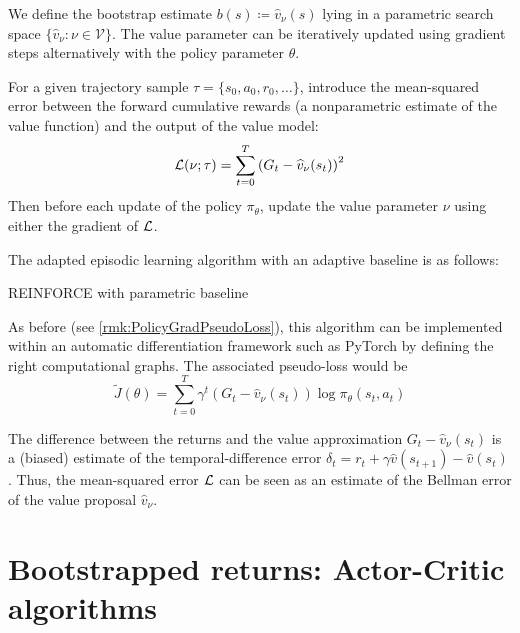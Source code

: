 \documentclass[../course-notes.tex]{subfiles}
\begin{document}
We define the bootstrap estimate $b(s) \coloneqq \widehat{v}_\nu(s)$ lying in a parametric search space $\{\widehat{v}_\nu : \nu \in \mathcal{V}\}$. The value parameter can be iteratively updated using gradient steps alternatively with the policy parameter $\theta$.

For a given trajectory sample $\tau=\{s_0,a_0,r_0,\ldots\}$, introduce the mean-squared error between the forward cumulative rewards (a nonparametric estimate of the value function) and the output of the value model:
\[
\mathcal{L}(\nu; \tau) =
\sum_{t=0}^{T} \left(G_t
- \widehat{v}_\nu(s_t)
\right)^2
\]
Then before each update of the policy $\pi_\theta$, update the value parameter $\nu$ using either the gradient of $\mathcal{L}$.

The adapted episodic learning algorithm with an adaptive baseline is as follows:
\begin{algorithm}
	\caption{REINFORCE with parametric baseline}\label{algo:REINFORCEparamBaseline}
\end{algorithm}

As before (see \cref{rmk:PolicyGradPseudoLoss}), this algorithm can be implemented within an automatic differentiation framework such as \textsf{PyTorch} by defining the right computational graphs. The associated pseudo-loss would be
\[
\tilde{J}(\theta) = 
\sum_{t=0}^T \gamma^t (G_t - \widehat{v}_\nu(s_t)) \log\pi_\theta(s_t, a_t)
\]

\begin{remark}
	The difference between the returns and the value approximation $G_t - \widehat{v}_\nu(s_t)$ is a (biased) estimate of the temporal-difference error $\delta_t = r_t + \gamma \widehat{v}(s_{t+1}) - \widehat{v}(s_t)$. Thus, the mean-squared error $\mathcal{L}$ can be seen as an estimate of the Bellman error of the value proposal $\widehat{v}_\nu$.
\end{remark}



\section{Bootstrapped returns: Actor-Critic algorithms}
\end{document}
